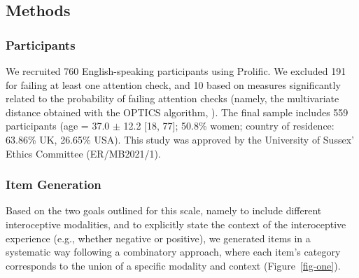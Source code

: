 \documentclass[
  jou,
  floatsintext,
  longtable,
  nolmodern,
  notxfonts,
  notimes,
  colorlinks=true,linkcolor=blue,citecolor=blue,urlcolor=blue]{apa7}
\begin{document}
\subsection{Methods}\label{methods}

\subsubsection{Participants}\label{participants}

We recruited 760 English-speaking participants using
Prolific\textcopyright. We excluded 191 for failing at least one
attention check, and 10 based on measures significantly related to the
probability of failing attention checks (namely, the multivariate
distance obtained with the OPTICS algorithm,
). The final
sample includes 559 participants (age = 37.0 \(\pm\) 12.2 {[}18, 77{]};
50.8\% women; country of residence: 63.86\% UK, 26.65\% USA). This study
was approved by the University of Sussex' Ethics Committee
(ER/MB2021/1).

\subsubsection{Item Generation}\label{item-generation}

Based on the two goals outlined for this scale, namely to include
different interoceptive modalities, and to explicitly state the context
of the interoceptive experience (e.g., whether negative or positive), we
generated items in a systematic way following a combinatory approach,
where each item's category corresponds to the union of a specific
modality and context (Figure~\ref{fig-one}).
\end{document}
